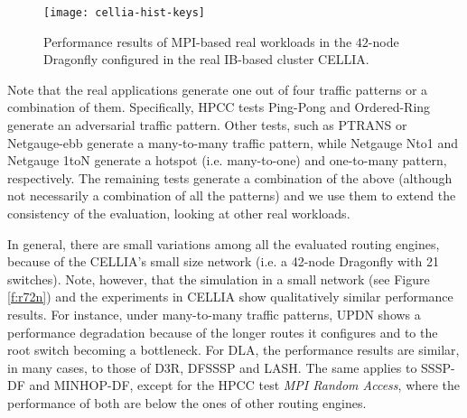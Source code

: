 \documentclass[review]{elsarticle}
\newcommand{\dfly}{Dragonfly}
\newcommand{\ib}{IB}
\begin{document}
\begin{figure}[!hptb]
        \centering
        \texttt{[image: cellia-hist-keys]}
        \vspace{-.6cm}




        \caption{Performance results of MPI-based real workloads in the $42$-node \dfly{} configured in the real \ib-based cluster CELLIA.}
        \label{f:benchmarks}
\end{figure}


Note that the real applications generate one out of four traffic patterns or a combination of them. 
Specifically, HPCC tests Ping-Pong and Ordered-Ring generate an adversarial traffic pattern. Other tests,
such as PTRANS or Netgauge-ebb generate a many-to-many traffic pattern,
while Netgauge Nto1 and Netgauge 1toN generate a hotspot (i.e. many-to-one) and one-to-many pattern, respectively.
The remaining tests generate a combination of the above (although not necessarily a combination of all the patterns)
and we use them to extend the consistency of the evaluation, looking at other real workloads.

In general, there are small variations among all the evaluated routing engines, because of the CELLIA's small size network
(i.e. a 42-node \dfly{} with 21 switches).
Note, however, that the simulation in a small network (see Figure \ref{f:r72n}) and the experiments in CELLIA show qualitatively similar performance results.
For instance, under many-to-many traffic patterns, UPDN shows a performance degradation because of the longer routes it configures and to the root switch becoming a bottleneck.
For DLA, the performance results are similar, in many cases, to those of D3R, DFSSSP and LASH.
The same applies to SSSP-DF and MINHOP-DF, except for the HPCC test \emph{MPI Random Access},
where the performance of both are below the ones of other routing engines.
\end{document}
